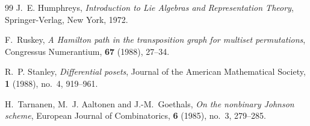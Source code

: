 \documentclass[12pt,reqno]{amsart}
\begin{document}
\begin{thebibliography}{99}
J.~E. Humphreys,
\textit{Introduction to Lie Algebras and Representation Theory},
Springer-Verlag, New York, 1972.

F.~Ruskey,
\textit{A Hamilton path in the transposition graph for multiset permutations},
Congressus Numerantium, \textbf{67} (1988), 27--34.

R.~P. Stanley,
\textit{Differential posets},
Journal of the American Mathematical Society, \textbf{1} (1988), no.~4,
919--961.

H.~Tarnanen, M.~J. Aaltonen and J.-M.~Goethals,
\textit{On the nonbinary Johnson scheme},
European Journal of Combinatorics, \textbf{6} (1985), no.~3, 279--285.

\end{thebibliography}
\end{document}
